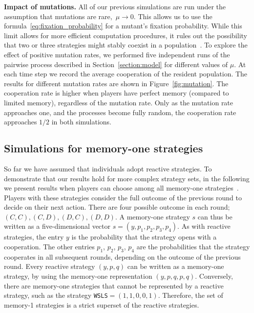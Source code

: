 \documentclass[11pt]{article}
\def\strategy{s}
\theoremstyle{plainCl1}
\theoremstyle{plainCl2}
\begin{document}
\noindent
{\bf Impact of mutations.} 
All of our previous simulations are run under the assumption that mutations are rare,~$\mu\!\rightarrow\!0$. 
This allows us to use the formula~\eqref{eq:fixation_probability} for a mutant's fixation probability. 
While this limit allows for more efficient computation procedures, it rules out the possibility that two or three strategies might stably coexist in a population~\cite{tkadlec:pnas:2023}.
To explore the effect of positive mutation rates, we performed five independent runs of the pairwise process described in
Section~\ref{section:model} for different values of $\mu$.
At each time step we record the average cooperation of the resident population. 
The results for different mutation rates are shown in Figure~\ref{fig:mutation}. 
The cooperation rate is higher when players have perfect memory (compared to limited memory), regardless of the
mutation rate. 
Only as the mutation rate approaches one, and the processes become fully random, the cooperation rate approaches $1/2$ in both simulations.



\subsection{Simulations for memory-one strategies}\label{section:memory_one}

So far we have assumed that individuals adopt reactive strategies.
To demonstrate that our results hold for more complex strategy sets, 
in the following we present results when players can choose among all memory-one strategies~\citep{sigmund2010calculus}. 
Players with these strategies consider the full outcome of the
previous round to decide on their next action. 
There are four possible outcome in each
round; \((C, C), (C, D), (D, C), (D, D)\). 
A memory-one strategy \(\strategy\) can thus be
written as a five-dimensional vector \(\strategy=(y, p_1, p_2, p_3, p_4)\). 
As with reactive strategies, the entry \(y\) is the probability that the strategy opens with a cooperation.
The other entries \(p_1\), \(p_2\), \(p_3\), \(p_4\) are the probabilities that the strategy
cooperates in all subsequent rounds, depending on the outcome of the previous round.
Every reactive strategy $(y,p,q)$ can be written as a memory-one strategy, by using the memory-one representation $(y,p,q,p,q)$.
Conversely, there are memory-one strategies that cannot be represented by a reactive strategy, such as the strategy \texttt{WSLS}$=(1,1,0,0,1)$. 
Therefore, the set of memory-1 strategies is a strict superset of the reactive strategies. 
\end{document}
